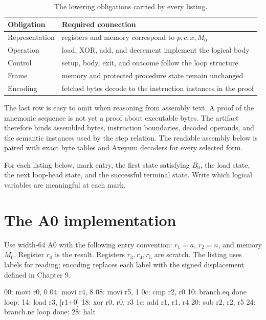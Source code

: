 \begin{table}[htbp]
\centering
\caption{The lowering obligations carried by every listing.}
\begin{tabular}{@{}p{}p{}@{}}
\toprule
Obligation & Required connection \\
\midrule
Representation & registers and memory correspond to \(p,c,x,M_0\) \\
Operation & load, XOR, add, and decrement implement the logical body \\
Control & setup, body, exit, and outcome follow the loop structure \\
Frame & memory and protected procedure state remain unchanged \\
Encoding & fetched bytes decode to the instruction instances in the proof \\
\bottomrule
\end{tabular}
\end{table}

The last row is easy to omit when reasoning from assembly text. A proof of the
mnemonic sequence is not yet a proof about executable bytes. The artifact
therefore binds assembled bytes, instruction boundaries, decoded operands, and
the semantic instances used by the step relation. The readable assembly below
is paired with exact byte tables and Axeyum decoders for every selected form.

\begin{tryit}[title={Build the cut-point map first}]
For each listing below, mark entry, the first state satisfying \(B_0\), the
load state, the next loop-head state, and the successful terminal state. Write
which logical variables are meaningful at each mark.
\end{tryit}

\section{The A0 implementation}

Use width-64 A0 with the following entry convention: \(r_1=a\), \(r_2=n\),
and memory \(M_0\). Register \(r_0\) is the result. Registers \(r_3,r_4,r_5\)
are scratch. The listing uses labels for reading; encoding replaces each label
with the signed displacement defined in Chapter 9.

\begin{codelisting}[language={},caption={A0 XOR reduction}]
00: movi      r0, 0
04: movi      r4, 8
08: movi      r5, 1
0c: cmp       r2, r0
10: branch.eq done
loop:
14: load      r3, [r1+0]
18: xor       r0, r0, r3
1c: add       r1, r1, r4
20: sub       r2, r2, r5
24: branch.ne loop
done:
28: halt
\end{codelisting}

